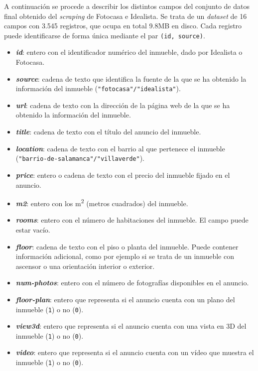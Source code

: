 \documentclass[12pt]{article}
\begin{document}
A continuación se procede a describir los distintos campos del conjunto de datos final obtenido del \textit{scraping} de Fotocasa e Idealista. Se trata de un \textit{dataset} de 16 campos con 3.545 registros, que ocupa en total 9.8MB en disco. Cada registro puede identificarse de forma única mediante el par \verb|(id, source)|.

\begin{itemize}[topsep=0cm,partopsep=0cm]
	\setlength\itemsep{-0.5em}
	\item \textbf{\textit{id}}: entero con el identificador numérico del inmueble, dado por Idealista o Fotocasa.
	\item \textbf{\textit{source}}: cadena de texto que identifica la fuente de la que se ha obtenido la información del inmueble (\verb|"fotocasa"/"idealista"|).
	\item \textbf{\textit{url}}: cadena de texto con la dirección de la página web de la que se ha obtenido la información del inmueble.
	\item \textbf{\textit{title}}: cadena de texto con el título del anuncio del inmueble.
	\item \textbf{\textit{location}}: cadena de texto con el barrio al que pertenece el inmueble \\ (\verb|"barrio-de-salamanca"/"villaverde"|).
	\item \textbf{\textit{price}}: entero o cadena de texto con el precio del inmueble fijado en el anuncio.
	\item \textbf{\textit{m2}}: entero con los m\textsuperscript{2} (metros cuadrados) del inmueble.
	\item \textbf{\textit{rooms}}: entero con el número de habitaciones del inmueble. El campo puede estar vacío.
	\item \textbf{\textit{floor}}: cadena de texto con el piso o planta del inmueble. Puede contener información adicional, como por ejemplo si se trata de un inmueble con ascensor o una orientación interior o exterior.
	\item \textbf{\textit{num-photos}}: entero con el número de fotografías disponibles en el anuncio.
	\item \textbf{\textit{floor-plan}}: entero que representa si el anuncio cuenta con un plano del inmueble (\verb|1|) o no (\verb|0|).
	\item \textbf{\textit{view3d}}: entero que representa si el anuncio cuenta con una vista en 3D del inmueble (\verb|1|) o no (\verb|0|).
	\item \textbf{\textit{video}}: entero que representa si el anuncio cuenta con un vídeo que muestra el inmueble (\verb|1|) o no (\verb|0|).

\end{itemize}
\end{document}
